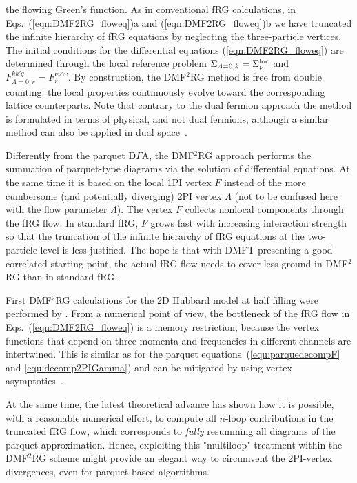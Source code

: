 \documentclass[rmp,aps,reprint,amsmath,amssymb,superscriptaddress,showpacs,nofootinbib]{revtex4-1}
\begin{document}
the flowing Green's function. As in conventional fRG calculations, in Eqs.~(\ref{eqn:DMF2RG_floweq})a and (\ref{eqn:DMF2RG_floweq})b we have truncated the infinite hierarchy of fRG equations by neglecting the three-particle vertices. The initial conditions for the differential equations (\ref{eqn:DMF2RG_floweq}) are determined through the local reference problem $\Sigma_{\mathit{\Lambda}=0,k}=\Sigma^{\rm loc}_\nu$ and $F_{\mathit{\Lambda}=0,r}^{kk'q}=F^{\nu \nu' \omega}_r$. By construction, the DMF$^2$RG method is free from  double counting: the local properties continuously evolve toward the corresponding lattice counterparts. Note that contrary to the dual fermion approach the method is formulated in terms of physical, and not dual fermions, although a similar method can also be applied in dual space~\cite{Wentzell2015,Katanin2015}.

Differently from  the parquet D$\Gamma$A, the DMF$^2$RG approach performs the summation of parquet-type diagrams via the solution of   differential  equations.  At the same time it is based on the local 1PI vertex $F$ instead of the more cumbersome (and potentially diverging) 2PI vertex ${\Lambda}$ (not to be confused here with the flow parameter $\mathit{\Lambda}$).  The vertex $F$ collects nonlocal components through the fRG flow. In standard fRG, $F$  grows fast with increasing interaction strength so that the truncation of the infinite hierarchy of fRG equations at the two-particle level is less justified. The hope is that with DMFT presenting a good correlated starting point, the actual fRG flow needs to cover less ground in DMF$^2$RG than in standard fRG.

First DMF$^2$RG calculations for the 2D Hubbard model at half filling were performed by . From a numerical point of view, the  bottleneck of the fRG flow in Eqs.~(\ref{eqn:DMF2RG_floweq}) is a memory restriction, because the vertex functions that depend on three momenta and frequencies in different channels are intertwined.  This is similar as for the parquet equations~(\ref{equ:parquedecompF} and \ref{equ:decomp2PIGamma}) and can be mitigated by using vertex asymptotics~\cite{Wentzell2016}.

At the same time, the latest theoretical advance \cite{Kugler2018,Kugler2018a} has shown how it is possible, with a reasonable numerical effort, to compute all $n$-loop contributions in the truncated fRG flow, which corresponds to {\sl fully} resumming all diagrams of the parquet approximation. Hence, exploiting this "multiloop" treatment within the DMF$^2$RG scheme might provide an elegant way to circumvent the 2PI-vertex divergences, even for parquet-based algortithms.
\end{document}

